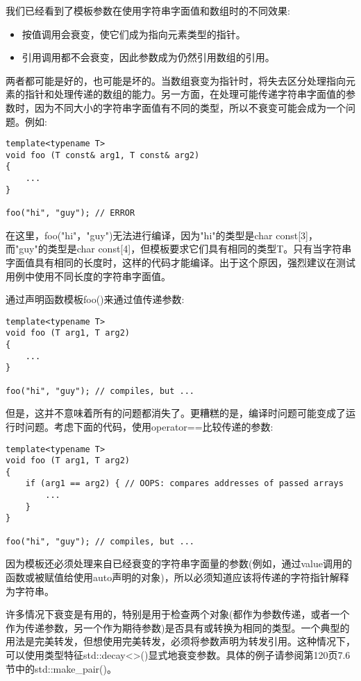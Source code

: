 
我们已经看到了模板参数在使用字符串字面值和数组时的不同效果:

\begin{itemize}
\item 
按值调用会衰变，使它们成为指向元素类型的指针。

\item 
引用调用都不会衰变，因此参数成为仍然引用数组的引用。
\end{itemize}

两者都可能是好的，也可能是坏的。当数组衰变为指针时，将失去区分处理指向元素的指针和处理传递的数组的能力。另一方面，在处理可能传递字符串字面值的参数时，因为不同大小的字符串字面值有不同的类型，所以不衰变可能会成为一个问题。例如:

\begin{lstlisting}[style=styleCXX]
template<typename T>
void foo (T const& arg1, T const& arg2)
{
	...
}

foo("hi", "guy"); // ERROR
\end{lstlisting}

在这里，foo("hi"，"guy")无法进行编译，因为"hi"的类型是char const[3]，而"guy"的类型是char const[4]，但模板要求它们具有相同的类型T。只有当字符串字面值具有相同的长度时，这样的代码才能编译。出于这个原因，强烈建议在测试用例中使用不同长度的字符串字面值。

通过声明函数模板foo()来通过值传递参数:

\begin{lstlisting}[style=styleCXX]
template<typename T>
void foo (T arg1, T arg2)
{
	...
}

foo("hi", "guy"); // compiles, but ...
\end{lstlisting}

但是，这并不意味着所有的问题都消失了。更糟糕的是，编译时问题可能变成了运行时问题。考虑下面的代码，使用operator==比较传递的参数:

\begin{lstlisting}[style=styleCXX]
template<typename T>
void foo (T arg1, T arg2)
{
	if (arg1 == arg2) { // OOPS: compares addresses of passed arrays
		...
	}
}

foo("hi", "guy"); // compiles, but ...
\end{lstlisting}

因为模板还必须处理来自已经衰变的字符串字面量的参数(例如，通过value调用的函数或被赋值给使用auto声明的对象)，所以必须知道应该将传递的字符指针解释为字符串。

许多情况下衰变是有用的，特别是用于检查两个对象(都作为参数传递，或者一个作为传递参数，另一个作为期待参数)是否具有或转换为相同的类型。一个典型的用法是完美转发，但想使用完美转发，必须将参数声明为转发引用。这种情况下，可以使用类型特征std::decay<>()显式地衰变参数。具体的例子请参阅第120页7.6节中的std::make\_pair()。

